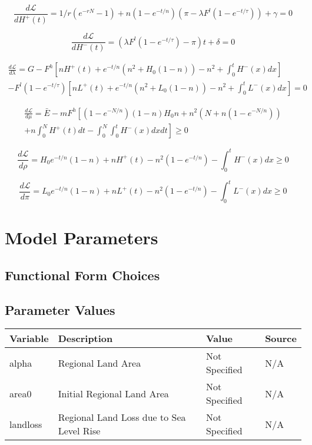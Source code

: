 \documentclass[singlespace]{easychithesis}
\newcommand{\Lagr}{\mathcal{L}}
\begin{document}
\begin{equation}
\frac{d\Lagr}{dH^+(t)} = 1/r(e^{-rN} -1) + n(1-e^{-t/n})(\pi - \lambda F^l(1-e^{-t/\tau})) + \gamma = 0
\end{equation}

\begin{equation}
\frac{d\Lagr}{dH^-(t)} = (\lambda F^l(1-e^{-t/\tau}) - \pi)t + \delta = 0
\end{equation}

\begin{multline}
\frac{d\Lagr}{d\lambda} = G - F^h\left[nH^+(t) + e^{-t/n}(n^2 + H_0(1-n)) - n^2 + \int_0^tH^-(x)dx\right] \\ - F^l (1-e^{-t/\tau})\left[nL^+(t) + e^{-t/n}(n^2 + L_0(1-n)) - n^2 + \int_0^tL^-(x)dx\right] = 0
\end{multline}

\begin{multline}
\frac{d\Lagr}{d\mu} = \bar{E} - mF^h \left [(1-e^{-N/n})(1-n)H_0 n + n^2(N + n(1-e^{-N/n})) \right.\\ + \left. n\int_0^N H^+(t) dt - \int_0^N\int_0^t H^-(x)dx dt   \right] \geq 0
\end{multline}

\begin{equation}
\frac{d\Lagr}{d\rho} = H_0 e^{-t/n}(1-n) + nH^+(t) - n^2(1-e^{-t/n}) - \int_0^t H^-(x)dx \geq 0 
\end{equation}

\begin{equation}
\frac{d\Lagr}{d\pi} = L_0 e^{-t/n}(1-n) + nL^+(t) - n^2(1-e^{-t/n}) - \int_0^t L^-(x)dx \geq 0 
\end{equation}






\section{Model Parameters}
\subsection{Functional Form Choices}


\subsection{Parameter Values}

\begin{tabulary}{1.0\textwidth}{LLLL}
    Variable & Description & Value & Source\\
    \hline
alpha &  Regional Land Area  &  Not Specified  &  N/A \\
area0 &  Initial Regional Land Area  &  Not Specified  &  N/A \\
landloss &  Regional Land Loss due to Sea Level Rise  &  Not Specified  &  N/A \\
	\hline
\end{tabulary}
\end{document}
